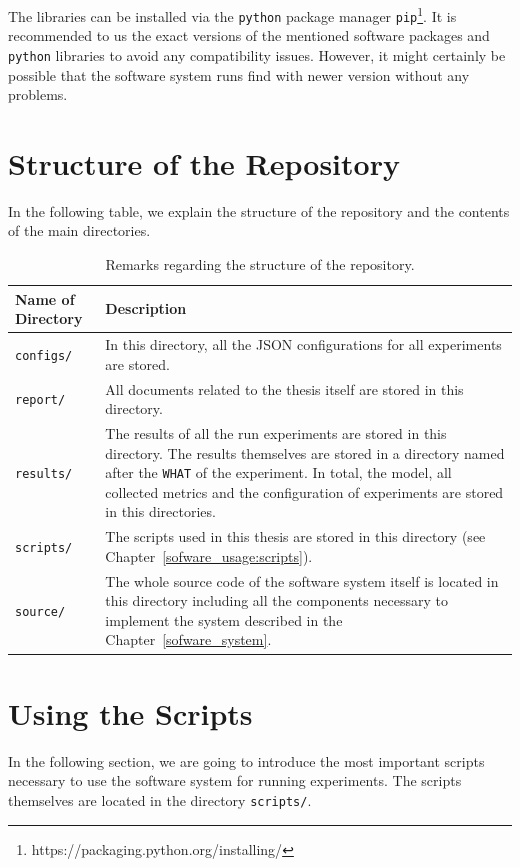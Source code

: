The libraries can be installed via the \texttt{python} package manager \texttt{pip}\footnote{https://packaging.python.org/installing/}. It is recommended to us the exact versions of the mentioned software packages and \texttt{python} libraries to avoid any compatibility issues. However, it might certainly be possible that the software system runs find with newer version without any problems.

\clearpage
\section{Structure of the Repository}
In the following table, we explain the structure of the repository and the contents of the main directories.

\begin{table}[H]
	\centering
	\begin{tabularx}{\textwidth}{lX}
		\toprule
		Name of Directory & Description\\ \midrule
		\texttt{configs/} & In this directory, all the JSON configurations for all experiments are stored.\\
		\texttt{report/} & All documents related to the thesis itself are stored in this directory.\\
		\texttt{results/} & The results of all the run experiments are stored in this directory. The results themselves are stored in a directory named after the \texttt{WHAT} of the experiment. In total, the model, all collected metrics and the configuration of experiments are stored in this directories.\\
		\texttt{scripts/} & The scripts used in this thesis are stored in this directory (see Chapter~\ref{sofware_usage:scripts}).\\
		\texttt{source/} & The whole source code of the software system itself is located in this directory including all the components necessary to implement the system described in the Chapter~\ref{sofware_system}.\\
		\bottomrule
	\end{tabularx}
	\caption{Remarks regarding the structure of the repository.}
\end{table}

\clearpage
\section{Using the Scripts}
In the following section, we are going to introduce the most important scripts necessary to use the software system for running experiments. The scripts themselves are located in the directory \texttt{scripts/}.

